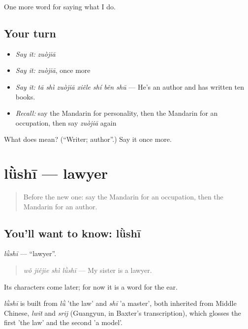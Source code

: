 \begin{grammarlens}[title={What you've built}]
One more word for saying what I do.
\end{grammarlens}

\subsection*{Your turn}
\begin{itemize}
\raggedright
  \item \emph{Say it:} \emph{zuòjiā}
  \item \emph{Say it:} \emph{zuòjiā}, once more
  \item \emph{Say it:} \emph{tā shì zuòjiā xiěle shí běn shū} — He's an author and has written ten books.
  \item \emph{Recall:} say the Mandarin for personality, then the Mandarin for an occupation, then say \emph{zuòjiā} again
\end{itemize}

\begin{tcolorbox}[breakable,colback=teal!4,colframe=teal!35!black,title={Before you move on}]
What does  mean? (\textquotedblleft{}Writer; author\textquotedblright{}.) Say it once more.
\end{tcolorbox}
\section[lǜshī]{lǜshī — lawyer}

\label{lesson:ZH-C259-lushi}



\begin{quote}
Before the new one: say the Mandarin for an occupation, then the Mandarin for an author.
\end{quote}

\subsection*{You'll want to know: lǜshī}
\emph{lǜshī} — \textquotedblleft{}lawyer\textquotedblright{}.

\begin{quote}
\emph{wǒ jiějie shì lǜshī} — My sister is a lawyer.
\end{quote}

Its characters come later; for now it is a word for the ear.

\begin{cousinweb}
\emph{lǜshī} is built from \emph{lǜ} 'the law' and \emph{shī} 'a master', both inherited from Middle Chinese, \emph{lwit} and \emph{srij} (Guangyun, in Baxter's transcription), which glosses the first 'the law' and the second 'a model'.
\end{cousinweb}

